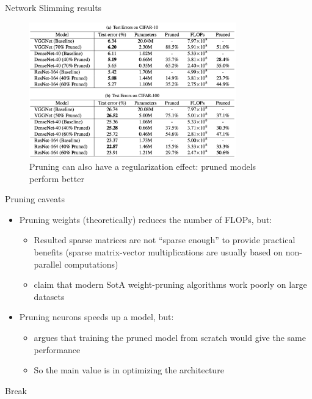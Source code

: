 \documentclass[10pt, handout]{beamer}
\begin{document}
\begin{frame}{Network Slimming results}
\begin{figure}
    \centering
    \includegraphics[width=0.8\textwidth]{images/network-slimming-results.png}
    \caption{Pruning can also have a regularization effect: pruned models perform better}
\end{figure}
\end{frame}

\begin{frame}{Pruning caveats}
\begin{itemize}
    \pause\item Pruning weights (theoretically) reduces the number of FLOPs, but:
    \begin{itemize}
        \pause\item Resulted sparse matrices are not ``sparse enough'' to provide practical benefits (sparse matrix-vector multiplications are usually based on non-parallel computations)
        \pause\item \cite{State_of_sparsity, Rethinking_Pruning} claim that modern SotA weight-pruning algorithms work poorly on large datasets
    \end{itemize}
    \pause\item Pruning neurons speeds up a model, but:
    \begin{itemize}
        \pause\item \cite{Rethinking_Pruning} argues that training the pruned model from scratch would give the same performance
        \pause\item So the main value is in optimizing the architecture
    \end{itemize}
\end{itemize}
\end{frame}


\begin{frame}
    Break
\end{frame}
\end{document}

